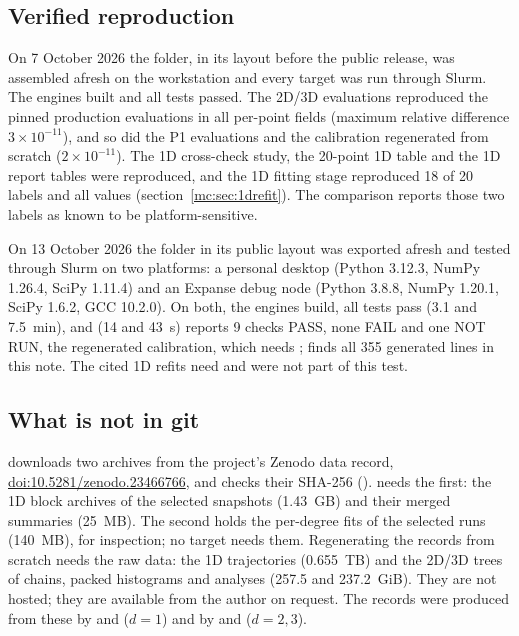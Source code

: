 \subsection{Verified reproduction}
On 7 October 2026 the folder, in its layout before the public release, was assembled afresh on the workstation and every target was run
through Slurm. The engines built and all tests passed. The 2D/3D evaluations reproduced the pinned production evaluations in all per-point
fields (maximum relative difference $3\times10^{-11}$), and so did the P1 evaluations and the calibration regenerated from scratch
($2\times10^{-11}$). The 1D cross-check study, the 20-point 1D table and the 1D report tables were reproduced, and the 1D fitting stage
reproduced 18 of 20 labels and all values (section~\ref{mc:sec:1drefit}). The comparison reports those two labels as known to be platform-sensitive.

On 13 October 2026 the folder in its public layout was exported afresh and tested through Slurm on two platforms: a personal desktop (Python 3.12.3,
NumPy 1.26.4, SciPy 1.11.4) and an Expanse debug node (Python 3.8.8, NumPy 1.20.1, SciPy 1.6.2, GCC 10.2.0). On both, the engines build, all tests
pass (3.1 and 7.5~min), and  (14 and 43~s) reports 9 checks PASS, none FAIL and one NOT RUN, the regenerated calibration, which
needs ;  finds all 355 generated lines in this note. The cited 1D refits need  and
were not part of this test.

\subsection{What is not in git}
 downloads two archives from the project's Zenodo data record, \href{https://doi.org/10.5281/zenodo.23466766}{doi:10.5281/zenodo.23466766}, and checks their SHA-256 ().
 needs the first: the 1D block archives of the selected snapshots (1.43~GB) and their merged summaries (25~MB). The second
holds the per-degree fits of the selected runs (140~MB), for inspection; no target needs them. Regenerating the records from scratch needs
the raw data: the 1D trajectories (0.655~TB) and the 2D/3D trees of chains, packed histograms and analyses (257.5 and 237.2~GiB). They are
not hosted; they are available from the author on request. The records were produced from
these by  and  ($d=1$) and by  and  ($d=2,3$).

